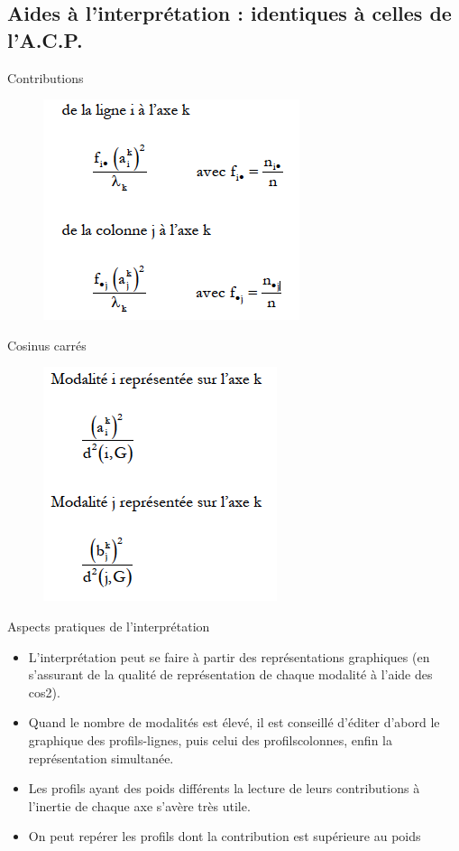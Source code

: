 \documentclass[12pt]{beamer}
\begin{document}
\subsection{Aides à l’interprétation : identiques à celles de l’A.C.P.}
\begin{frame}{Contributions}
\begin{figure}
\includegraphics[scale=0.6]{exemple16.png}  
\end{figure}
\end{frame}

\begin{frame}{Cosinus carrés}
\begin{figure}
\includegraphics[scale=0.6]{exemple17.png}  
\end{figure}

\end{frame}

\begin{frame}{Aspects pratiques de l’interprétation}

\begin{itemize}
\item L’interprétation peut se faire à partir des représentations graphiques (en s’assurant de la qualité de représentation de chaque modalité à
l’aide des cos2).
\item Quand le nombre de modalités est élevé, il est conseillé d’éditer d’abord le graphique des profils-lignes, puis celui des profilscolonnes, enfin la représentation simultanée.

\item Les profils ayant des poids différents la lecture de leurs
contributions à l’inertie de chaque axe s’avère très utile.

\item On peut repérer les profils dont la contribution est supérieure au poids
\end{itemize}
\end{frame}
\end{document}
